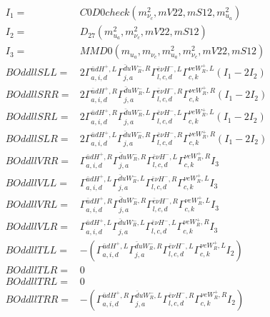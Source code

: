\documentclass[A4,landscape]{article}
\begin{document}
\begin{align} 
I_1 = & C0D0check(m^2_{\nu_{{c}}}, mV22, mS12, m^2_{u_{{a}}}) \\ 
I_2 = & D_{27}(m^2_{u_{{a}}}, m^2_{\nu_{{c}}}, mV22, mS12) \\ 
I_3 = & MMD0(m_{u_{{a}}}, m_{\nu_{{c}}}, m^2_{u_{{a}}}, m^2_{\nu_{{c}}}, mV22, mS12) \\ 
  BOddllSLL= & 2  \Gamma^{\bar{u}d H^+,L}_{a, i, d} \Gamma^{\bar{d}u W_R^- ,R}_{j, a} \Gamma^{\bar{e}\nu H^- ,L}_{l, c, d} \Gamma^{\nu e W_R^+,L}_{c, k} (I_1 - 2 I_2) \\ 
  BOddllSRR= & 2  \Gamma^{\bar{u}d H^+,R}_{a, i, d} \Gamma^{\bar{d}u W_R^- ,L}_{j, a} \Gamma^{\bar{e}\nu H^- ,R}_{l, c, d} \Gamma^{\nu e W_R^+,R}_{c, k} (I_1 - 2 I_2) \\ 
  BOddllSRL= & 2  \Gamma^{\bar{u}d H^+,R}_{a, i, d} \Gamma^{\bar{d}u W_R^- ,L}_{j, a} \Gamma^{\bar{e}\nu H^- ,L}_{l, c, d} \Gamma^{\nu e W_R^+,L}_{c, k} (I_1 - 2 I_2) \\ 
  BOddllSLR= & 2  \Gamma^{\bar{u}d H^+,L}_{a, i, d} \Gamma^{\bar{d}u W_R^- ,R}_{j, a} \Gamma^{\bar{e}\nu H^- ,R}_{l, c, d} \Gamma^{\nu e W_R^+,R}_{c, k} (I_1 - 2 I_2) \\ 
  BOddllVRR= &  \Gamma^{\bar{u}d H^+,R}_{a, i, d} \Gamma^{\bar{d}u W_R^- ,R}_{j, a} \Gamma^{\bar{e}\nu H^- ,L}_{l, c, d} \Gamma^{\nu e W_R^+,R}_{c, k} I_3 \\ 
  BOddllVLL= &  \Gamma^{\bar{u}d H^+,L}_{a, i, d} \Gamma^{\bar{d}u W_R^- ,L}_{j, a} \Gamma^{\bar{e}\nu H^- ,R}_{l, c, d} \Gamma^{\nu e W_R^+,L}_{c, k} I_3 \\ 
  BOddllVRL= &  \Gamma^{\bar{u}d H^+,R}_{a, i, d} \Gamma^{\bar{d}u W_R^- ,R}_{j, a} \Gamma^{\bar{e}\nu H^- ,R}_{l, c, d} \Gamma^{\nu e W_R^+,L}_{c, k} I_3 \\ 
  BOddllVLR= &  \Gamma^{\bar{u}d H^+,L}_{a, i, d} \Gamma^{\bar{d}u W_R^- ,L}_{j, a} \Gamma^{\bar{e}\nu H^- ,L}_{l, c, d} \Gamma^{\nu e W_R^+,R}_{c, k} I_3 \\ 
  BOddllTLL= & -( \Gamma^{\bar{u}d H^+,L}_{a, i, d} \Gamma^{\bar{d}u W_R^- ,R}_{j, a} \Gamma^{\bar{e}\nu H^- ,L}_{l, c, d} \Gamma^{\nu e W_R^+,L}_{c, k} I_2) \\ 
  BOddllTLR= & 0 \\ 
  BOddllTRL= & 0 \\ 
  BOddllTRR= & -( \Gamma^{\bar{u}d H^+,R}_{a, i, d} \Gamma^{\bar{d}u W_R^- ,L}_{j, a} \Gamma^{\bar{e}\nu H^- ,R}_{l, c, d} \Gamma^{\nu e W_R^+,R}_{c, k} I_2) \\ 
\end{align} 
\end{document}
